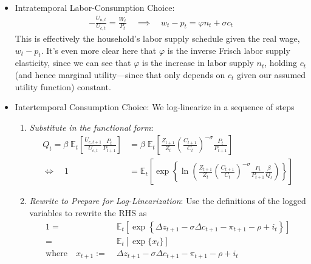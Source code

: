 \documentclass[12pt]{article}
\theoremstyle{plain}
\theoremstyle{definition}
\theoremstyle{remark}
\newcommand{\E}{\mathbb{E}}
\begin{document}
\begin{itemize}
  \item Intratemporal Labor-Consumption Choice:
    \begin{align*}
      -\frac{U_{n,t}}{U_{c,t}}
      =
      \frac{W_t}{P_{t}}
      \quad\implies\quad
      w_t - p_t
      =
      \varphi n_t
      + \sigma c_t
    \end{align*}
    This is effectively the household's labor supply schedule given the
    real wage, $w_t-p_t$. It's even more clear here that $\varphi$ is
    the inverse Frisch labor supply elasticity, since we can see that
    $\varphi$ is the increase in labor supply $n_t$, holding $c_t$ (and
    hence marginal utility---since that only depends on $c_t$ given our
    assumed utility function) constant.

  \item Intertemporal Consumption Choice:
    We log-linearize in a sequence of steps
    \begin{enumerate}[label=(\roman*)]
      \item \emph{Substitute in the functional form}:
        \begin{align*}
          Q_t =
          \beta\;
          \E_t\left[
            \frac{U_{c,t+1}}{U_{c,t}}
            \frac{P_t}{P_{t+1}}
          \right]
          &=
          \beta\;
          \E_t\left[
            \frac{Z_{t+1}}{Z_{t}}
            \left(\frac{C_{t+1}}{C_t}\right)^{-\sigma}
            \frac{P_t}{P_{t+1}}
          \right] \\
          \iff\quad
          1 &=
          \E_t\left[
            \exp\left\{
            \ln
            \left(
            \frac{Z_{t+1}}{Z_{t}}
            \left(\frac{C_{t+1}}{C_t}\right)^{-\sigma}
            \frac{P_t}{P_{t+1}}
            \frac{\beta}{Q_t}
            \right)
            \right\}
          \right]
        \end{align*}

      \item \emph{Rewrite to Prepare for Log-Linearization}:
        Use the definitions of the logged variables to rewrite the RHS
        as
        \begin{align*}
          1
          =&\;
          \E_t\left[
            \exp\left\{
            \Delta z_{t+1}
            -\sigma \Delta c_{t+1}
            - \pi_{t+1}
            -\rho
            + i_t
            \right\}
          \right]\\
          =&\; \E_t[\exp\{x_t\}] \\
          \text{where} \quad
          x_{t+1} :=&\;
            \Delta z_{t+1}
            -\sigma \Delta c_{t+1}
            - \pi_{t+1}
            -\rho
            + i_t
        \end{align*}


\end{enumerate}
\end{itemize}
\end{document}
